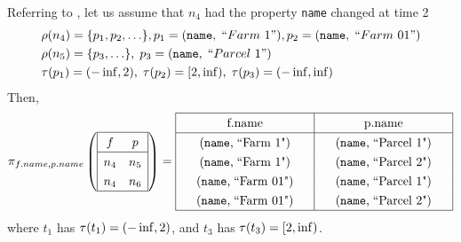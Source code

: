 \begin{example}
Referring to , let us assume that $n_4$ had the property \texttt{name} changed at time 2
\[
\begin{aligned}
&\rho(n_4) = \{p_1, p_2,\ldots\}, p_1 = (\texttt{name},\;``Farm~1"),p_2 = (\texttt{name},\;``Farm~01")\\
&\rho(n_5) = \{p_3, \ldots\},\;p_3 = (\texttt{name},\;``Parcel~1")\\
&\tau(p_1)  = (-\inf, 2),\;\tau(p_2) = [2, \inf),\;\tau(p_3) = (-\inf, \inf)
\end{aligned}
\]
Then,
\[
\renewcommand{\arraystretch}{1.3}
\pi_{f.name,p.name}\left(\begin{array}{|cc|}
\hline
f & p \\
\hline
n_4  & n_5 \\
n_4  & n_6 \\
\hline
\end{array}\right)
=
\begin{array}{|>{\centering\arraybackslash}p{3.6cm}|>{\centering\arraybackslash}p{3.6cm}|}
\hline
f.name & p.name \\
\hline
\prop{name}{``Farm~1"}  & \prop{name}{``Parcel~1"} \\
\prop{name}{``Farm~1"}  & \prop{name}{``Parcel~2"} \\
\prop{name}{``Farm~01"} & \prop{name}{``Parcel~1"} \\
\prop{name}{``Farm~01"} & \prop{name}{``Parcel~2"} \\
\hline
\end{array}
\]
where $t_1$ has $\tau(t_1)=(-\inf,2)$, 
and $t_3$ has $\tau(t_3)=[2,\inf)$.
\end{example}


